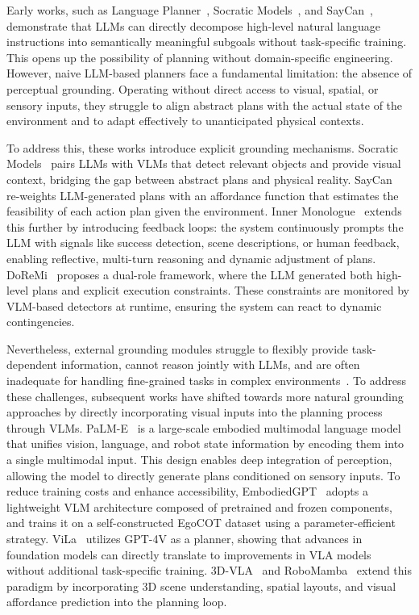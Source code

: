 \documentclass[10pt, a4paper, logo, copyright]{googledeepmind} %
\begin{document}
Early works, such as Language Planner~\cite{huang2022language}, Socratic Models~\cite{zeng2022socratic}, and SayCan~\cite{saycan2022arxiv}, demonstrate that LLMs can directly decompose high-level natural language instructions into semantically meaningful subgoals without task-specific training. This opens up the possibility of planning without domain-specific engineering. 
However, naive LLM-based planners face a fundamental limitation: the absence of perceptual grounding. Operating without direct access to visual, spatial, or sensory inputs, they struggle to align abstract plans with the actual state of the environment and to adapt effectively to unanticipated physical contexts.

To address this, these works introduce explicit grounding mechanisms. 
Socratic Models~\cite{zeng2022socratic} pairs LLMs with VLMs that detect relevant objects and provide visual context, bridging the gap between abstract plans and physical reality. 
SayCan~\cite{saycan2022arxiv} re-weights LLM-generated plans with an affordance function that estimates the feasibility of each action plan given the environment. 
Inner Monologue~\cite{huang2022inner} extends this further by introducing feedback loops: the system continuously prompts the LLM with signals like success detection, scene descriptions, or human feedback, enabling reflective, multi-turn reasoning and dynamic adjustment of plans. DoReMi~\cite{guo2024doremi} proposes a dual-role framework, where the LLM generated both high-level plans and explicit execution constraints. 
These constraints are monitored by VLM-based detectors at runtime, ensuring the system can react to dynamic contingencies.

Nevertheless, external grounding modules struggle to flexibly provide task-dependent information, cannot reason jointly with LLMs, and are often inadequate for handling fine-grained tasks in complex environments~\cite{hu2023look}. To address these challenges, subsequent works have shifted towards more natural grounding approaches by directly incorporating visual inputs into the planning process through VLMs.
PaLM-E~\cite{driess2023palme} is a large-scale embodied multimodal language model that unifies vision, language, and robot state information by encoding them into a single multimodal input. This design enables deep integration of perception, allowing the model to directly generate plans conditioned on sensory inputs.
To reduce training costs and enhance accessibility, EmbodiedGPT~\cite{mu2023embodiedgpt} adopts a lightweight VLM architecture composed of pretrained and frozen components, and trains it on a self-constructed EgoCOT dataset using a parameter-efficient strategy.
ViLa~\cite{hu2023look} utilizes GPT-4V as a planner, showing that advances in foundation models can directly translate to improvements in VLA models without additional task-specific training. 
3D-VLA~\cite{zhen20243d} and RoboMamba~\cite{RoboMamba} extend this paradigm by incorporating 3D scene understanding, spatial layouts, and visual affordance prediction into the planning loop.
\end{document}
